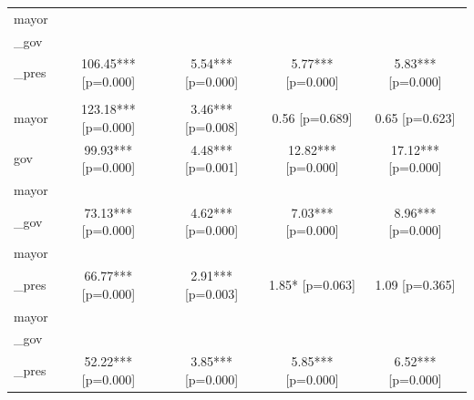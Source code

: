 \begin{tabular}{lcccc}
mayor\\_gov\\_pres & 106.45*** [p=0.000] & 5.54*** [p=0.000] & 5.77*** [p=0.000] & 5.83*** [p=0.000] \\
\addlinespace
\multicolumn{5}{l}{Panel D: owner\_legacy} \\
mayor & 123.18*** [p=0.000] & 3.46*** [p=0.008] & 0.56 [p=0.689] & 0.65 [p=0.623] \\
gov & 99.93*** [p=0.000] & 4.48*** [p=0.001] & 12.82*** [p=0.000] & 17.12*** [p=0.000] \\
mayor\\_gov & 73.13*** [p=0.000] & 4.62*** [p=0.000] & 7.03*** [p=0.000] & 8.96*** [p=0.000] \\
mayor\\_pres & 66.77*** [p=0.000] & 2.91*** [p=0.003] & 1.85* [p=0.063] & 1.09 [p=0.365] \\
mayor\\_gov\\_pres & 52.22*** [p=0.000] & 3.85*** [p=0.000] & 5.85*** [p=0.000] & 6.52*** [p=0.000] \\
\bottomrule
\end{tabular}
